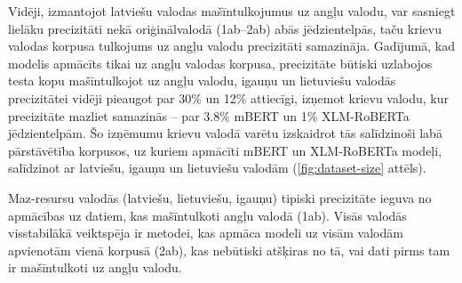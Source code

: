 Vidēji, izmantojot latviešu valodas mašīntulkojumus uz angļu valodu, var sasniegt lielāku precizitāti nekā oriģinālvalodā (1ab--2ab) abās jēdzientelpās, taču krievu valodas korpusa tulkojums uz angļu valodu precizitāti samazināja. Gadījumā, kad modelis apmācīts tikai uz angļu valodas korpusa, precizitāte būtiski uzlabojos testa kopu mašīntulkojot uz angļu valodu, igauņu un lietuviešu valodās precizitātei vidēji pieaugot par 30\% un 12\% attiecīgi, izņemot krievu valodu, kur precizitāte mazliet samazinās -- par 3.8\% mBERT un 1\% XLM-RoBERTa jēdzientelpām. Šo izņēmumu krievu valodā varētu izskaidrot tās salīdzinoši labā pārstāvētība korpusos, uz kuriem apmācīti mBERT un XLM-RoBERTa modeļi, salīdzinot ar latviešu, igauņu un lietuviešu valodām (\ref{fig:dataset-size} attēls).



Maz-resursu valodās (latviešu, lietuviešu, igauņu) tipiski precizitāte ieguva no apmācības uz datiem, kas mašīntulkoti angļu valodā (1ab). Visās valodās visstabilākā veiktspēja ir metodei, kas apmāca modeli uz visām valodām apvienotām vienā korpusā (2ab), kas nebūtiski atšķiras no tā, vai dati pirms tam ir mašīntulkoti uz angļu valodu.


